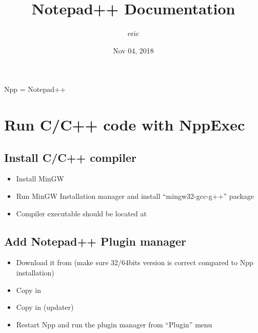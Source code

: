 \documentclass[letterpaper,10pt,english]{sphinxmanual}
\title{Notepad++ Documentation}
\date{Nov 04, 2018}
\author{eric}
\begin{document}
\pagestyle{empty}
\maketitle
\pagestyle{plain}
\sphinxtableofcontents
\pagestyle{normal}
\label{\detokenize{index::doc}}


Npp = Notepad++


\chapter{Run C/C++ code with NppExec}
\label{\detokenize{index:run-c-c-code-with-nppexec}}

\section{Install C/C++ compiler}
\label{\detokenize{index:install-c-c-compiler}}\begin{itemize}
\item {} 
Install MinGW

\item {} 
Run MinGW Installation manager and install “mingw32-gcc-g++” package

\item {} 
Compiler executable should be located at 

\end{itemize}


\section{Add Notepad++ Plugin manager}
\label{\detokenize{index:add-notepad-plugin-manager}}\begin{itemize}
\item {} 
Download it from  (make sure 32/64bits version is correct compared to Npp installation)

\item {} 
Copy  in 

\item {} 
Copy  in  (updater)

\item {} 
Restart Npp and run the plugin manager from “Plugin” menu

\end{itemize}
\end{document}
